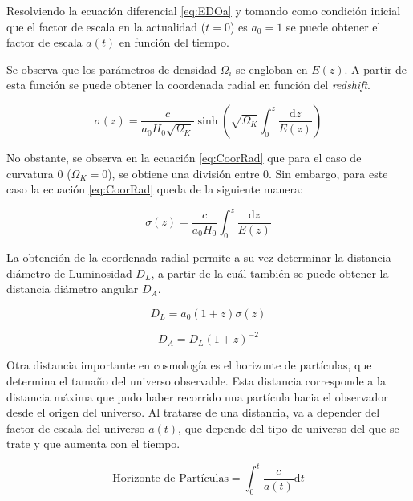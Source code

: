 \documentclass[twoside]{article}
\begin{document}
			Resolviendo la ecuación diferencial \ref{eq:EDOa} y tomando como condición inicial que el factor de escala en la actualidad ($t=0$) es $a_0 =  1$ se puede obtener el factor de escala $a(t)$ en función del tiempo.

			Se observa que los parámetros de densidad $\Omega_i$ se engloban en $E(z)$. A partir de esta función se puede obtener la coordenada radial en función del \textit{redshift}.

				\begin{equation}
					\sigma(z) = \frac{c}{a_0H_0\sqrt{\Omega_K}} \sinh\left( \sqrt{\Omega_K} \int^z_0 \frac{\mathrm{d}z}{E(z)}\right)
					\label{eq:CoorRad}
				\end{equation}

			No obstante, se observa en la ecuación \ref{eq:CoorRad} que para el caso de curvatura 0 ($\Omega_K = 0$), se obtiene una división entre 0. Sin embargo, para este caso la ecuación \ref{eq:CoorRad} queda de la siguiente manera:

				\begin{equation}
					\sigma(z) = \frac{c}{a_0H_0} \int^z_0 \frac{\mathrm{d}z}{E(z)}
					\label{eq:CoorRadK0}
				\end{equation}

			La obtención de la coordenada radial permite a su vez determinar la distancia diámetro de Luminosidad $D_L$, a partir de la cuál también se puede obtener la distancia diámetro angular $D_A$.

				\begin{equation}
					D_L = a_0 (1+z)\sigma(z)
					\label{eq:dL}
				\end{equation}

				\begin{equation}
					D_A = D_L (1+z)^{-2}
					\label{eq:dA} 
				\end{equation}

			Otra distancia importante en cosmología es el horizonte de partículas, que determina el tamaño del universo observable. Esta distancia corresponde a la distancia máxima que pudo haber recorrido una partícula hacia el observador desde el origen del universo. Al tratarse de una distancia, va a depender del factor de escala del universo $a(t)$, que depende del tipo de universo del que se trate y que aumenta con el tiempo.

				\begin{equation}
					\textrm{Horizonte de Partículas} = \int_0^t \frac{c}{a(t)} \mathrm{d}t
					\label{eq:HorizntPart}
				\end{equation}
\end{document}
